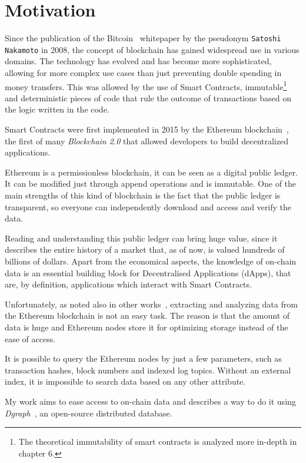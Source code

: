 
\section{Motivation}

Since the publication of the Bitcoin~\cite{bitcoin} whitepaper by the pseudonym {\tt Satoshi Nakamoto} in 2008, the concept of blockchain has gained widespread use in various domains. The technology has evolved and has become more sophisticated, allowing for more complex use cases than just preventing double spending in money transfers. This was allowed by the use of Smart Contracts, immutable\footnote{The theoretical immutability of smart contracts is analyzed more in-depth in chapter 6.} and deterministic pieces of code that rule the outcome of transactions based on the logic written in the code.

Smart Contracts were first implemented in 2015 by the Ethereum blockchain~\cite{Ethereum}, the first of many \textit{Blockchain 2.0} that allowed developers to build decentralized applications. 

Ethereum is a permissionless blockchain, it can be seen as a digital public ledger. It can be modified just through append operations and is immutable. One of the main strengths of this kind of blockchain is the fact that the public ledger is transparent, so everyone can independently download and access and verify the data.

Reading and understanding this public ledger can bring huge value, since it describes the entire history of a market that, as of now, is valued hundreds of billions of dollars. Apart from the economical aspects, the knowledge of on-chain data is an essential building block for Decentralised Applications (dApps), that are, by definition, applications which interact with Smart Contracts.

Unfortunately, as noted also in other works~\cite{dataether,xblock-eth,ethereum_query_language}, extracting and analyzing data from the Ethereum blockchain is not an easy task. The reason is that the amount of data is huge and Ethereum nodes store it for optimizing storage instead of the ease of access. 

It is possible to query the Ethereum nodes by just a few parameters, such as transaction hashes, block numbers and indexed log topics. 
Without an external index, it is impossible to search data based on any other attribute.

My work aims to ease access to on-chain data and describes a way to do it using \textit{Dgraph}~\cite{dgraph}, an open-source distributed database.

